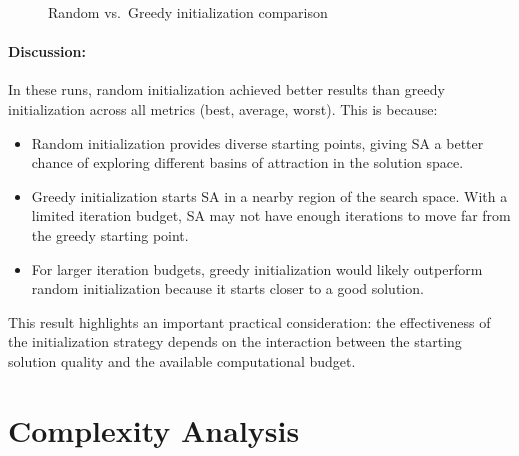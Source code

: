 \documentclass[12pt,a4paper]{article}
\begin{document}
\begin{figure}[H]
\centering
{}
\caption{Random vs.\ Greedy initialization comparison}
\end{figure}

\paragraph{Discussion:}
In these runs, random initialization achieved better results than greedy initialization across all metrics (best, average, worst). This is because:
\begin{itemize}
    \item Random initialization provides diverse starting points, giving SA a better chance of exploring different basins of attraction in the solution space.
    \item Greedy initialization starts SA in a nearby region of the search space. With a limited iteration budget, SA may not have enough iterations to move far from the greedy starting point.
    \item For larger iteration budgets, greedy initialization would likely outperform random initialization because it starts closer to a good solution.
\end{itemize}

This result highlights an important practical consideration: the effectiveness of the initialization strategy depends on the interaction between the starting solution quality and the available computational budget.

\section{Complexity Analysis}
\end{document}
